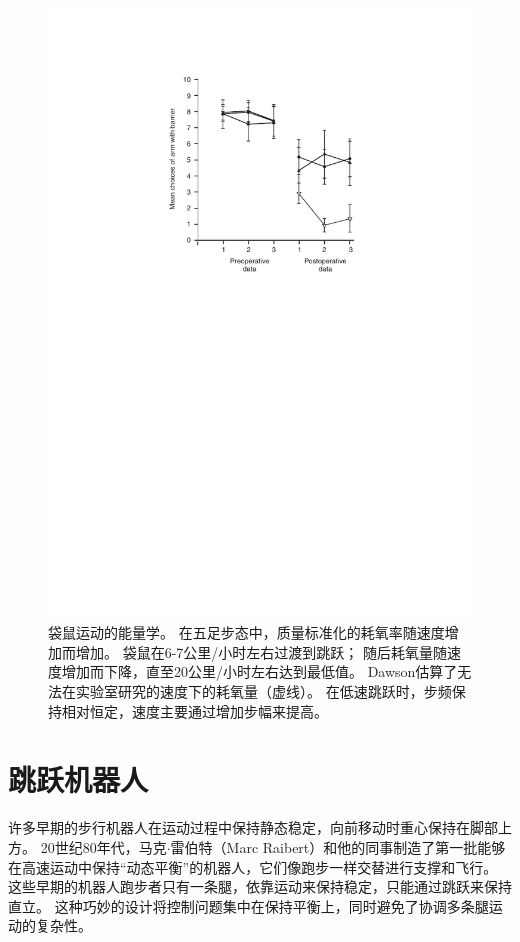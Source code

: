 \begin{figure}[!htb]
	\centering
	\includegraphics[width=1.0\linewidth]{chap3/3_7}
	\caption{袋鼠运动的能量学。
		在五足步态中，质量标准化的耗氧率随速度增加而增加。
		袋鼠在6-7公里/小时左右过渡到跳跃；
		随后耗氧量随速度增加而下降，直至20公里/小时左右达到最低值。
		Dawson\cite{dawson1977kangaroos}估算了无法在实验室研究的速度下的耗氧量（虚线）。
		在低速跳跃时，步频保持相对恒定，速度主要通过增加步幅来提高\cite{dawson1977kangaroos}。 \label{fig:3_7}}
\end{figure}


\section{跳跃机器人}

许多早期的步行机器人在运动过程中保持静态稳定，向前移动时重心保持在脚部上方。
20世纪80年代，马克$\cdot$雷伯特（Marc Raibert）和他的同事制造了第一批能够在高速运动中保持“动态平衡”的机器人，它们像跑步一样交替进行支撑和飞行。
这些早期的机器人跑步者只有一条腿，依靠运动来保持稳定，只能通过跳跃来保持直立。
这种巧妙的设计将控制问题集中在保持平衡上，同时避免了协调多条腿运动的复杂性。


